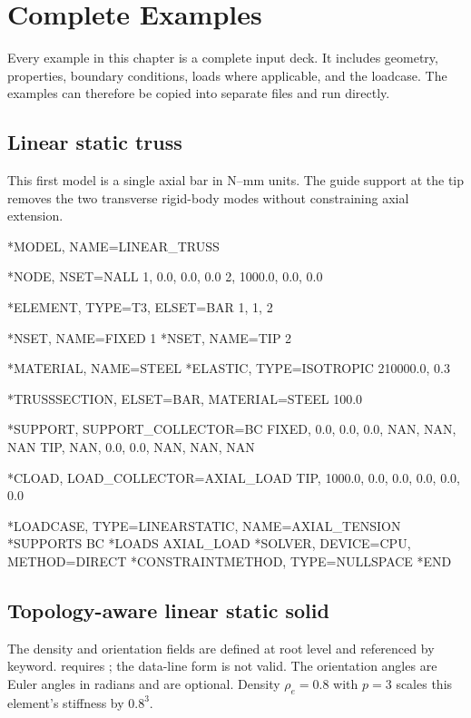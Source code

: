 \chapter{Complete Examples}

Every example in this chapter is a complete input deck. It includes geometry, properties, boundary conditions, loads where applicable, and the loadcase. The examples can therefore be copied into separate  files and run directly.

\section{Linear static truss}

This first model is a single axial bar in N--mm units. The guide support at the tip removes the two transverse rigid-body modes without constraining axial extension.

\begin{exampledeck}
*MODEL, NAME=LINEAR_TRUSS

*NODE, NSET=NALL
1,    0.0, 0.0, 0.0
2, 1000.0, 0.0, 0.0

*ELEMENT, TYPE=T3, ELSET=BAR
1, 1, 2

*NSET, NAME=FIXED
1
*NSET, NAME=TIP
2

*MATERIAL, NAME=STEEL
*ELASTIC, TYPE=ISOTROPIC
210000.0, 0.3

*TRUSSSECTION, ELSET=BAR, MATERIAL=STEEL
100.0

*SUPPORT, SUPPORT_COLLECTOR=BC
FIXED, 0.0, 0.0, 0.0, NAN, NAN, NAN
TIP,   NAN, 0.0, 0.0, NAN, NAN, NAN

*CLOAD, LOAD_COLLECTOR=AXIAL_LOAD
TIP, 1000.0, 0.0, 0.0, 0.0, 0.0, 0.0

*LOADCASE, TYPE=LINEARSTATIC, NAME=AXIAL_TENSION
*SUPPORTS
BC
*LOADS
AXIAL_LOAD
*SOLVER, DEVICE=CPU, METHOD=DIRECT
*CONSTRAINTMETHOD, TYPE=NULLSPACE
*END
\end{exampledeck}

\section{Topology-aware linear static solid}

The density and orientation fields are defined at root level and referenced by keyword.  requires ; the data-line form is not valid. The orientation angles are Euler angles in radians and are optional. Density \(\rho_e=0.8\) with \(p=3\) scales this element's stiffness by \(0.8^3\).

